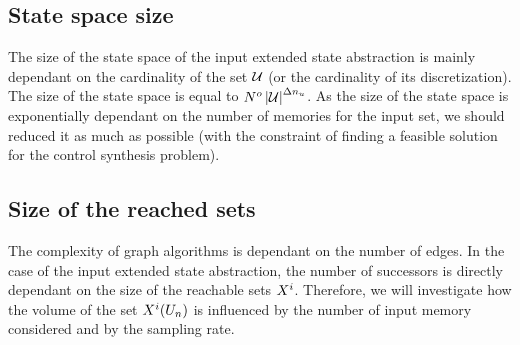 %
%
%

\subsection{State space size}
The size of the state space of the input extended state abstraction is mainly dependant on the cardinality of the set $\mathcal{U}$ (or the cardinality of its discretization).
The size of the state space is equal to $N^o \left|\mathcal{U}\right|^{\Delta n_u}$.
As the size of the state space is exponentially dependant on the number of memories for the input set, we should reduced it as much as possible (with the constraint of finding a feasible solution for the control synthesis problem).

\subsection{Size of the reached sets}
The complexity of graph algorithms is dependant on the number of edges.
In the case of the input extended state abstraction, the number of successors is directly dependant on the size of the reachable sets $X^i$.
Therefore, we will investigate how the volume of the set  $X^i(U_n)$ is influenced by the number of input memory considered and by the sampling rate.

